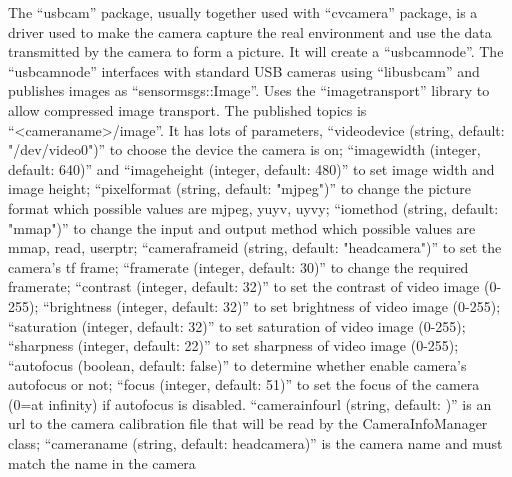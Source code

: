 \documentclass[paper=a4, fontsize=11pt]{scrartcl} %
\numberwithin{equation}{section} %
\numberwithin{figure}{section} %
\numberwithin{table}{section} %
\begin{document}
\begin{enumerate}
The “usb\underline{\hspace{0.5em}}cam” package, usually together used with “cv\underline{\hspace{0.5em}}camera” package, is a driver used to make the camera capture the real environment and use the data transmitted by the camera to form a picture. It will create a “usb\underline{\hspace{0.5em}}cam\underline{\hspace{0.5em}}node”. The “usb\underline{\hspace{0.5em}}cam\underline{\hspace{0.5em}}node” interfaces with standard USB cameras using “libusb\underline{\hspace{0.5em}}cam” and publishes images as “sensor\underline{\hspace{0.5em}}msgs::Image”. Uses the “image\underline{\hspace{0.5em}}transport” library to allow compressed image transport. The published topics is “<camera\underline{\hspace{0.5em}}name>/image”. It has lots of parameters, “video\underline{\hspace{0.5em}}device (string, default: "/dev/video0")” to choose the device the camera is on; “image\underline{\hspace{0.5em}}width (integer, default: 640)” and “image\underline{\hspace{0.5em}}height (integer, default: 480)” to set image width and image height; “pixel\underline{\hspace{0.5em}}format (string, default: "mjpeg")” to change the picture format which possible values are mjpeg, yuyv, uyvy; “io\underline{\hspace{0.5em}}method (string, default: "mmap")” to change the input and output method which possible values are mmap, read, userptr; “camera\underline{\hspace{0.5em}}frame\underline{\hspace{0.5em}}id (string, default: "head\underline{\hspace{0.5em}}camera")” to set the camera's tf frame; “framerate (integer, default: 30)” to change the required framerate; “contrast (integer, default: 32)” to set the contrast of video image (0-255); “brightness (integer, default: 32)” to set brightness of video image (0-255); “saturation (integer, default: 32)” to set saturation of video image (0-255); “sharpness (integer, default: 22)” to set sharpness of video image (0-255); “autofocus (boolean, default: false)” to determine whether enable camera's autofocus or not; “focus (integer, default: 51)” to set the focus of the camera (0=at infinity) if autofocus is disabled. “camera\underline{\hspace{0.5em}}info\underline{\hspace{0.5em}}url (string, default: )” is an url to the camera calibration file that will be read by the CameraInfoManager class; “camera\underline{\hspace{0.5em}}name (string, default: head\underline{\hspace{0.5em}}camera)” is the camera name and must match the name in the camera 
\end{enumerate}
\end{document}
